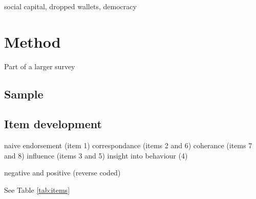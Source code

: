 \documentclass[
  ,jou,floatsintext]{apa6}
\begin{document}
social capital, dropped wallets, democracy

\hypertarget{method}{%
\section{Method}\label{method}}

Part of a larger survey

\hypertarget{sample}{%
\subsection{Sample}\label{sample}}

\hypertarget{item-development}{%
\subsection{Item development}\label{item-development}}

naive endorsement (item 1)
correspondance (items 2 and 6)
coherance (items 7 and 8)
influence (items 3 and 5)
insight into behaviour (4)

negative and positive (reverse coded)

See Table \ref{tab:items}
\end{document}
